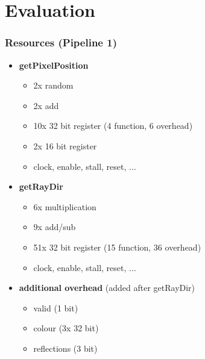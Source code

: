 \documentclass{beamer}
\begin{document}
\section{Evaluation}
\begin{frame}
	\frametitle{Resources (Pipeline 1)}
	\begin{itemize}
		\item \textbf{getPixelPosition}
			\begin{itemize}
				\item 2x random
				\item 2x add
				\item 10x 32 bit register (4 function, 6 overhead)
				\item 2x 16 bit register
				\item clock, enable, stall, reset, ...
			\end{itemize}
		\item \textbf{getRayDir}
			\begin{itemize}
				\item 6x multiplication
				\item 9x add/sub
				\item 51x 32 bit register (15 function, 36 overhead)
				\item clock, enable, stall, reset, ...
			\end{itemize}
		\item \textbf{additional overhead} (added after getRayDir)
			\begin{itemize}
				\item valid (1 bit)
				\item colour (3x 32 bit)
				\item reflections (3 bit)
			\end{itemize}
	\end{itemize}
\end{frame}
\end{document}
